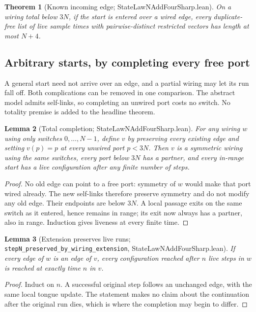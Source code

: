 \documentclass[11pt]{article}
\newtheorem{theorem}{Theorem}[section]
\newtheorem{lemma}[theorem]{Lemma}
\theoremstyle{definition}
\newcommand{\lean}[1]{\texttt{#1}}
\newcommand{\file}[1]{\textsf{#1}}
\begin{document}
\begin{theorem}[Known incoming edge;
  \file{StateLawNAddFourSharp.lean}]\label{thm:knownedge}
  On a wiring total below $3N$, if the start is entered over a wired edge,
  every duplicate-free list of
  live sample times with pairwise-distinct restricted vectors has length
  at most $N+4$.
\end{theorem}

\subsection{Arbitrary starts, by completing every free port}
\label{ssec:boundary}

A general start need not arrive over an edge, and a partial wiring may let
its run fall off. Both complications can be removed in one comparison.
The abstract model admits self-links, so completing an unwired port costs
no switch. No totality premise is added to the headline theorem.

\begin{lemma}[Total completion; \file{StateLawNAddFourSharp.lean}]
  \label{lem:cap}
  For any wiring $w$ using only switches $0,\dots,N-1$, define $v$ by
  preserving every existing edge and setting $v(p)=p$ at every unwired
  port $p<3N$. Then $v$ is a symmetric wiring using the same switches,
  every port below $3N$ has a partner, and every in-range start has a live
  configuration after any finite number of steps.
\end{lemma}

\begin{proof}
  No old edge can point to a free port: symmetry of $w$ would make that
  port wired already. The new self-links therefore preserve symmetry and
  do not modify any old edge. Their endpoints are below $3N$. A local
  passage exits on the same switch as it entered, hence remains in range;
  its exit now always has a partner, also in range. Induction gives
  liveness at every finite time.
\end{proof}

\begin{lemma}[Extension preserves live runs;
  \lean{stepN\_preserved\_by\_wiring\_extension},
  \file{StateLawNAddFourSharp.lean}]\label{lem:extend}
  If every edge of $w$ is an edge of $v$, every configuration reached
  after $n$ live steps in $w$ is reached at exactly time $n$ in $v$.
\end{lemma}

\begin{proof}
  Induct on $n$. A successful original step follows an unchanged edge,
  with the same local tongue update. The statement makes no claim about
  the continuation after the original run dies, which is where the
  completion may begin to differ.
\end{proof}
\end{document}
